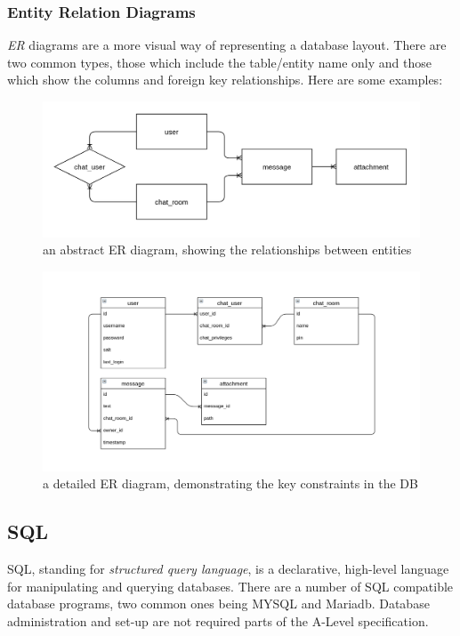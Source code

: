 \documentclass[9pt]{article}
\begin{document}
\subsubsection{Entity Relation Diagrams}
\label{sec:orge1b369d}

\emph{ER} diagrams are a more visual way of representing a database layout. There are two common types, those which include the table/entity name only and those which show the columns and foreign key relationships. Here are some examples:

\begin{figure}[htbp]
\centering
\includegraphics[width=.9\linewidth]{./images/simple_er.png}
\caption{an abstract ER diagram, showing the relationships between entities}
\end{figure}

\begin{figure}[htbp]
\centering
\includegraphics[width=.9\linewidth]{./images/advanced_er.png}
\caption{a detailed ER diagram, demonstrating the key constraints in the DB}
\end{figure}

\subsection{SQL}
\label{sec:org9c8bd27}

SQL, standing for \emph{structured query language}, is a declarative, high-level language for manipulating and querying databases. There are a number of SQL compatible database programs, two common ones being MYSQL and Mariadb. Database administration and set-up are not required parts of the A-Level specification.
\end{document}
